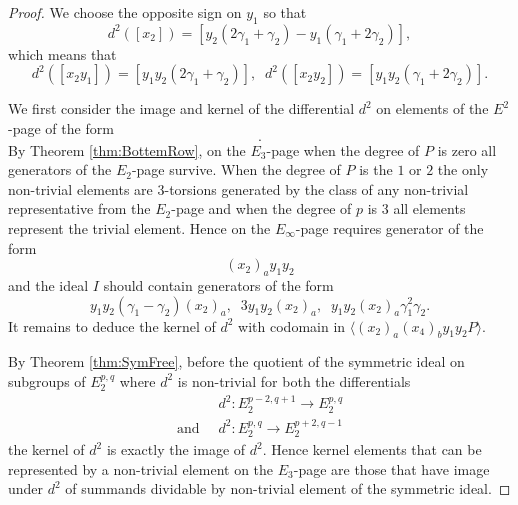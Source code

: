 \documentclass{article}
\theoremstyle{plain}
\theoremstyle{definition}
\numberwithin{thm}{section}
\begin{document}
\begin{proof}
				We choose the opposite sign on $y_1$ so that
				\begin{equation}\label{eq:diff2}
					d^2([x_2])=[y_2(2\gamma_1+\gamma_2)-y_1(\gamma_1+2\gamma_2)],
				\end{equation}
				which means that 
				\begin{equation}\label{eq:diff2y}
					d^2([x_2y_1])=[y_1y_2(2\gamma_1+\gamma_2)], \;\; d^2([x_2y_2])=[y_1y_2(\gamma_1+2\gamma_2)].
				\end{equation}
				
				We first consider the image and kernel of the differential $d^2$ on elements of the $E^2$-page of the form
				\begin{equation*}
					[(x_2)_a(x_4)_by_1y_2P].
				\end{equation*}
				By Theorem \ref{thm:BottemRow}, on the $E_3$-page when the degree of $P$ is zero all generators of the $E_2$-page survive.
				When the degree of $P$ is the $1$ or $2$ the only non-trivial elements are $3$-torsions generated by the class of any non-trivial representative from the $E_2$-page
				and when the degree of $p$ is $3$ all elements represent the trivial element.
				Hence on the $E_\infty$-page
				requires generator of the form
				\begin{equation*}
					(x_2)_ay_1y_2
				\end{equation*}
				and the ideal $I$ should contain generators of the form
				\begin{equation*}
					y_1y_2(\gamma_1-\gamma_2)(x_2)_a,\;\; 3y_1y_2(x_2)_a,\;\; y_1y_2(x_2)_a\gamma_1^2\gamma_2.
				\end{equation*}
				It remains to deduce the kernel of $d^2$ with codomain in $\langle (x_2)_a(x_4)_by_1y_2P \rangle$.
				
				By Theorem \ref{thm:SymFree}, before the quotient of the symmetric ideal on subgroups of $E_2^{p,q}$ where $d^2$ is non-trivial for both the differentials
				\begin{align*}
													&d^2\colon E_2^{p-2,q+1} \to E_2^{p,q} \\
					\text{and} \;\; &d^2\colon E_2^{p,q} \to E_2^{p+2,q-1}
				\end{align*} 
				the kernel of $d^2$ is exactly the image of $d^2$.
				Hence kernel elements that can be represented by a non-trivial element on the $E_3$-page are those that have image under $d^2$
				of summands dividable by non-trivial element of the symmetric ideal.
				

\end{proof}
\end{document}
